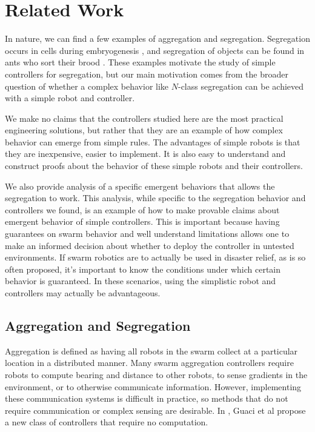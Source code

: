 \documentclass[conference]{IEEEtran}
\begin{document}
\section{Related Work}

  In nature, we can find a few examples of aggregation and segregation. Segregation occurs in cells during embryogenesis \cite{batlle_molecular_2012}, and segregation of objects can be found in ants who sort their brood \cite{santos_segregation_2014}. These examples motivate the study of simple controllers for segregation, but our main motivation comes from the broader question of whether a complex behavior like $N$-class segregation can be achieved with a simple robot and controller.

  We make no claims that the controllers studied here are the most practical engineering solutions, but rather that they are an example of how complex behavior can emerge from simple rules. The advantages of simple robots is that they are inexpensive, easier to implement. It is also easy to understand and construct proofs about the behavior of these simple robots and their controllers.

  We also provide analysis of a specific emergent behaviors that allows the segregation to work. This analysis, while specific to the segregation behavior and controllers we found, is an example of how to make provable claims about emergent behavior of simple controllers. This is important because having guarantees on swarm behavior and well understand limitations allows one to make an informed decision about whether to deploy the controller in untested environments. If swarm robotics are to actually be used in disaster relief, as is so often proposed, it's important to know the conditions under which certain behavior is guaranteed. In these scenarios, using the simplistic robot and controllers may actually be advantageous.

  \subsection{Aggregation and Segregation}

    Aggregation is defined as having all robots in the swarm collect at a particular location in a distributed manner. Many swarm aggregation controllers require robots to compute bearing and distance to other robots, to sense gradients in the environment, or to otherwise communicate information. However, implementing these communication systems is difficult in practice, so methods that do not require communication or complex sensing are desirable. In \cite{gauci_self-organized_2014}, Guaci et al propose a new class of controllers that require no computation.
\end{document}
